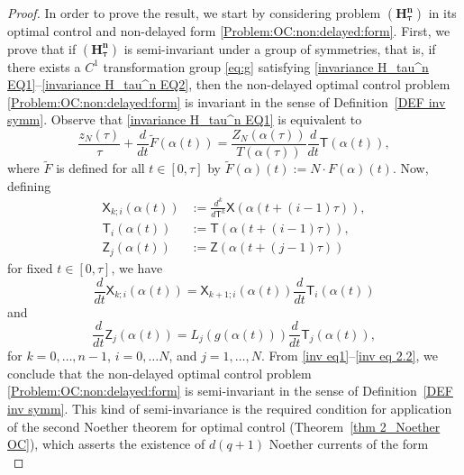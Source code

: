 \documentclass{my-aims}
\theoremstyle{definition}
\begin{document}
\begin{proof}
In order to prove the result, we start by considering problem 
$\mathbf{(H_\tau^n)}$ in its optimal control and non-delayed 
form \eqref{Problem:OC:non:delayed:form}. First, we prove that 
if $\mathbf{(H_\tau^n)}$ is semi-invariant under a group of symmetries, 
that is, if there exists a $C^1$ transformation group \eqref{eq:g} 
satisfying \eqref{invariance H_tau^n EQ1}--\eqref{invariance H_tau^n EQ2},
then the non-delayed optimal control problem 
\eqref{Problem:OC:non:delayed:form} is invariant in the sense 
of Definition~\ref{DEF inv symm}. Observe that 
\eqref{invariance H_tau^n EQ1} is equivalent to
\begin{equation}
\label{inv eq1}
\frac{z_N(\tau)}{\tau}+\frac{d}{dt} \tilde{F}(\alpha(t))
= \frac{Z_N(\alpha(\tau))}{T\left(\alpha(\tau)\right)}\frac{d}{dt}\mathsf{T}(\alpha(t)),
\end{equation}
where $\tilde{F}$ is defined for all 
$t \in [0,\tau]$ by $\tilde{F}(\alpha)(t):=N \cdot F(\alpha)(t)$.
Now, defining 
\begin{equation*}
\begin{split}
\mathsf{X}_{k;i}(\alpha(t))&:=\frac{d^k }{d\mathsf{T}^k}\mathsf{X}(\alpha(t+(i-1)\tau)),\\
\mathsf{T}_i(\alpha(t))&:=\mathsf{T}(\alpha(t+(i-1)\tau)),\\
\mathsf{Z}_j(\alpha(t))&:=\mathsf{Z}(\alpha(t+(j-1)\tau))
\end{split}
\end{equation*}
for fixed $t \in [0, \tau]$, we have
\begin{equation}
\label{inv eq 2.1}
\frac{d}{dt}\mathsf{X}_{k;i}(\alpha(t))
=\mathsf{X}_{k+1;i}(\alpha(t))\frac{d}{dt}\mathsf{T}_{i}(\alpha(t))
\end{equation}
and
\begin{equation}
\label{inv eq 2.2}
\frac{d }{dt}\mathsf{Z}_j(\alpha(t))
= L_j\left(g(\alpha(t))\right) \frac{d}{dt}\mathsf{T}_j(\alpha(t)),
\end{equation}
for $k=0,\dots, n-1$, $i=0,\dots N$, and $j=1,\dots,N$.
From \eqref{inv eq1}--\eqref{inv eq 2.2}, we conclude 
that the non-delayed optimal control problem \eqref{Problem:OC:non:delayed:form} 
is semi-invariant in the sense of Definition~\ref{DEF inv symm}. 
This kind of semi-invariance is the required condition 
for application of the second Noether 
theorem for optimal control (Theorem~\ref{thm 2_Noether OC}), 
which asserts the existence of $d(q+1)$ Noether currents of the form
\begin{equation*}

\end{equation*}
\end{proof}
\end{document}
